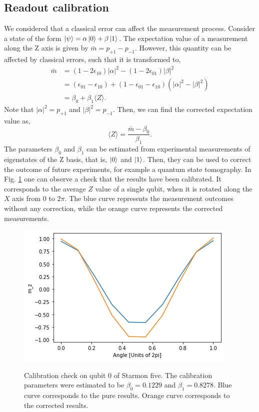 \documentclass[11pt]{article}
\begin{document}
\subsection{Readout calibration}
We considered that a classical error can affect the measurement process. Consider a state of the form $\ket{\psi} = \alpha\ket{0}+\beta\ket{1}$. The expectation value of a measurement along the Z axis is given by $\bar{m}=p_{+1}-p_{-1}$. However, this quantity can be affected by classical errors, such that it is transformed to,
\begin{align}
\bar{m} &= (1-2\epsilon_{10})|\alpha|^2-(1-2\epsilon_{01})|\beta|^2\\
&=(\epsilon_{01}-\epsilon_{10})+(1-\epsilon_{01}-\epsilon_{10})(|\alpha|^2-|\beta|^2)\\
&= \beta_0 + \beta_1 \langle Z\rangle.
\end{align}
Note that $|\alpha|^2=p_{+1}$ and $|\beta|^2=p_{-1}$. Then, we can find the corrected expectation value as,
\begin{equation}
\langle Z\rangle = \frac{\bar{m}-\beta_0}{\beta_1}.
\end{equation}
The parameters $\beta_0$ and $\beta_1$ can be estimated from experimental measurements of eigenstates of the Z basis, that is, $\ket{0}$ and $\ket{1}$. Then, they can be used to correct the outcome of future experiments, for example a quantum state tomography. In Fig. \ref{fig:3a} one can observe a check that the results have been calibrated. It corresponds to the average $Z$ value of a single qubit, when it is rotated along the $X$ axis from $0$ to $2\pi$. The blue curve represents the measurement outcomes without any correction, while the orange curve represents the corrected measurements. 
\begin{figure}[H]
    \centering
            \includegraphics[totalheight=6cm]{Figures/tomography.png}
        \label{fig:3a}\caption{Calibration check on qubit 0 of Starmon five. The calibration parameters were estimated to be $\beta_0 = 0.1229$ and $\beta_1=0.8278$. Blue curve corresponds to the pure results. Orange curve corresponds to the corrected results.}
\end{figure}
\end{document}
